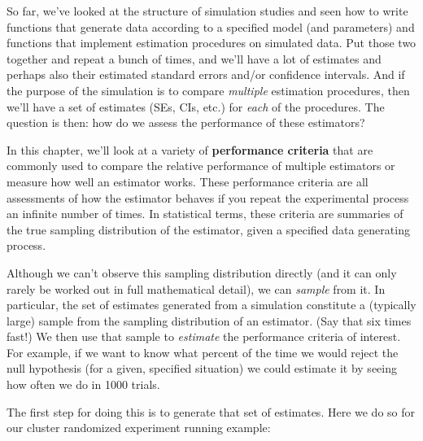 \documentclass[
]{book}
\begin{document}
So far, we've looked at the structure of simulation studies and seen how to write functions that generate data according to a specified model (and parameters) and functions that implement estimation procedures on simulated data.
Put those two together and repeat a bunch of times, and we'll have a lot of estimates and perhaps also their estimated standard errors and/or confidence intervals.
And if the purpose of the simulation is to compare \emph{multiple} estimation procedures, then we'll have a set of estimates (SEs, CIs, etc.) for \emph{each} of the procedures.
The question is then: how do we assess the performance of these estimators?

In this chapter, we'll look at a variety of \textbf{performance criteria} that are commonly used to compare the relative performance of multiple estimators or measure how well an estimator works.
These performance criteria are all assessments of how the estimator behaves if you repeat the experimental process an infinite number of times.
In statistical terms, these criteria are summaries of the true sampling distribution of the estimator, given a specified data generating process.

Although we can't observe this sampling distribution directly (and it can only rarely be worked out in full mathematical detail), we can \emph{sample} from it.
In particular, the set of estimates generated from a simulation constitute a (typically large) sample from the sampling distribution of an estimator. (Say that six times fast!)
We then use that sample to \emph{estimate} the performance criteria of interest.
For example, if we want to know what percent of the time we would reject the null hypothesis (for a given, specified situation) we could estimate it by seeing how often we do in 1000 trials.

The first step for doing this is to generate that set of estimates.
Here we do so for our cluster randomized experiment running example:
\end{document}
